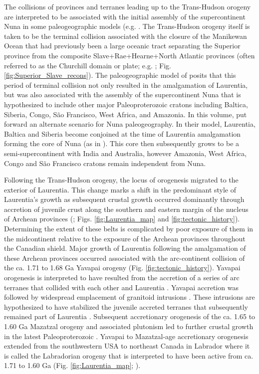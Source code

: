 \documentclass[twocolumn, switch]{article} %
\begin{document}
The collisions of provinces and terranes leading up to the Trans-Hudson orogeny are interpreted to be associated with the initial assembly of the supercontinent Nuna in some paleogeographic models (e.g. \citealp{Zhang2012a,Pehrsson2015a}. The Trans-Hudson orogeny itself is taken to be the terminal collision associated with the closure of the Manikewan Ocean that had previously been a large oceanic tract separating the Superior province from the composite Slave+Rae+Hearne+North Atlantic provinces (often referred to as the Churchill domain or plate; e.g. \citealp{Skipton2016a, Weller2017a}; Fig. \ref{fig:Superior_Slave_recons}). The paleogeographic model of \cite{Pehrsson2015a} posits that this period of terminal collision not only resulted in the amalgamation of Laurentia, but was also associated with the assembly of the supercontinent Nuna that is hypothesized to include other major Paleoproterozoic cratons including Baltica, Siberia, Congo, S\~ao Francisco, West Africa, and Amazonia. In this volume, \cite{Elming2021a} put forward an alternate scenario for Nuna paleogeography. In their model,  Laurentia, Baltica and Siberia become conjoined at the time of Laurentia amalgamation forming the core of Nuna (as in \citealp{Evans2011a}). This core then subsequently grows to be a semi-supercontinent with India and Australia, however Amazonia, West Africa, Congo and S\~ao Francisco cratons remain independent from Nuna.

Following the Trans-Hudson orogeny, the locus of orogenesis migrated to the exterior of Laurentia. This change marks a shift in the predominant style of Laurentia's growth as subsequent crustal growth occurred dominantly through accretion of juvenile crust along the southern and eastern margin of the nucleus of Archean provinces (\citealp{Whitmeyer2007a}; Figs. \ref{fig:Laurentia_map} and \ref{fig:tectonic_history}). Determining the extent of these belts is complicated by poor exposure of them in the midcontinent relative to the exposure of the Archean provinces throughout the Canadian shield. Major growth of Laurentia following the amalgamation of these Archean provinces occurred associated with the arc-continent collision of the ca. 1.71 to 1.68 Ga Yavapai orogeny (Fig. \ref{fig:tectonic_history}). Yavapai orogenesis is interpreted to have resulted from the accretion of a series of arc terranes that collided with each other and Laurentia \citep{Karlstrom2001a}. Yavapai accretion was followed by widespread emplacement of granitoid intrusions \citep{Whitmeyer2007a}. These intrusions are hypothesized to have stabilized the juvenile accreted terranes that subsequently remained part of Laurentia \citep{Whitmeyer2007a}. Subsequent accretionary orogenesis of the ca. 1.65 to 1.60 Ga Mazatzal orogeny and associated plutonism led to further crustal growth in the latest Paleoproterozoic \citep{Karlstrom1988a}. Yavapai to Mazatzal-age accretionary orogenesis extended from the southwestern USA to northeast Canada in Labrador where it is called the Labradorian orogeny that is interpreted to have been active from ca. 1.71 to 1.60 Ga (Fig. \ref{fig:Laurentia_map}; \citealp{Gower1992a, Gower2008b}). 
\end{document}

